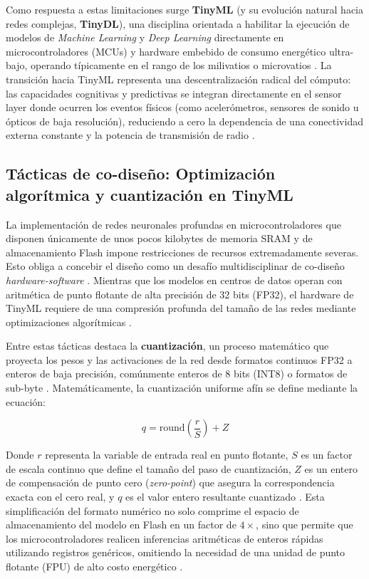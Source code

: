 \documentclass[12pt, a4paper]{article}
\begin{document}
Como respuesta a estas limitaciones surge \textbf{TinyML} (y su evolución natural hacia redes complejas, \textbf{TinyDL}), una disciplina orientada a habilitar la ejecución de modelos de \textit{Machine Learning} y \textit{Deep Learning} directamente en microcontroladores (MCUs) y hardware embebido de consumo energético ultra-bajo, operando típicamente en el rango de los milivatios o microvatios \parencite{somvanshi2025tiny, ray2022review}. La transición hacia TinyML representa una descentralización radical del cómputo: las capacidades cognitivas y predictivas se integran directamente en el sensor layer donde ocurren los eventos físicos (como acelerómetros, sensores de sonido u ópticos de baja resolución), reduciendo a cero la dependencia de una conectividad externa constante y la potencia de transmisión de radio \parencite{capogrosso2023machine, ray2022review}.

\subsection{Tácticas de co-diseño: Optimización algorítmica y cuantización en TinyML}

La implementación de redes neuronales profundas en microcontroladores que disponen únicamente de unos pocos kilobytes de memoria SRAM y de almacenamiento Flash impone restricciones de recursos extremadamente severas. Esto obliga a concebir el diseño como un desafío multidisciplinar de co-diseño \textit{hardware-software} \parencite{capogrosso2023machine}. Mientras que los modelos en centros de datos operan con aritmética de punto flotante de alta precisión de 32 bits (FP32), el hardware de TinyML requiere de una compresión profunda del tamaño de las redes mediante optimizaciones algorítmicas \parencite{somvanshi2025tiny}.

Entre estas tácticas destaca la \textbf{cuantización}, un proceso matemático que proyecta los pesos y las activaciones de la red desde formatos continuos FP32 a enteros de baja precisión, comúnmente enteros de 8 bits (INT8) o formatos de sub-byte \parencite{somvanshi2025tiny}. Matemáticamente, la cuantización uniforme afín se define mediante la ecuación:

\begin{equation}
q = \text{round}\left(\frac{r}{S}\right) + Z
\end{equation}

Donde $r$ representa la variable de entrada real en punto flotante, $S$ es un factor de escala continuo que define el tamaño del paso de cuantización, $Z$ es un entero de compensación de punto cero (\textit{zero-point}) que asegura la correspondencia exacta con el cero real, y $q$ es el valor entero resultante cuantizado \parencite{somvanshi2025tiny}. Esta simplificación del formato numérico no solo comprime el espacio de almacenamiento del modelo en Flash en un factor de $4\times$, sino que permite que los microcontroladores realicen inferencias aritméticas de enteros rápidas utilizando registros genéricos, omitiendo la necesidad de una unidad de punto flotante (FPU) de alto costo energético \parencite{somvanshi2025tiny}.
\end{document}
